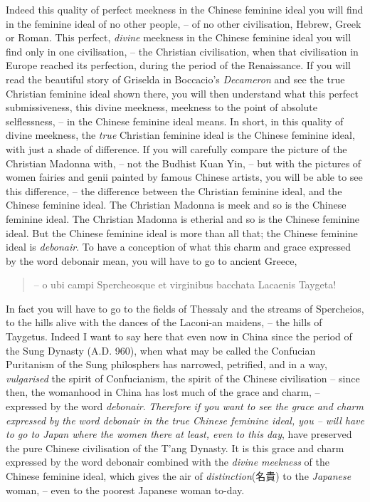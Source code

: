 Indeed this quality of perfect meekness in the Chinese feminine ideal you will find in the feminine ideal of no other people,
-- of no other civilisation, Hebrew, Greek or Roman.
This perfect, \emph{divine} meekness in the Chinese feminine ideal you will find only in one civilisation,
-- the Christian civilisation, when that civilisation in Europe reached its perfection, during the period of the Renaissance.
If you will read the beautiful story of Griselda in Boccacio's \emph{Decameron} and see the true Christian feminine ideal shown there,
you will then understand what this perfect submissiveness,
this divine meekness, meekness to the point of absolute selflessness,
-- in the Chinese feminine ideal means.
In short, in this quality of divine meekness, the \emph{true} Christian feminine ideal is the Chinese feminine ideal,
with just a shade of difference.
If you will carefully compare the picture of the Christian Madonna with,
-- not the Budhist Kuan Yin,
-- but with the pictures of women fairies and genii painted by famous Chinese artists, you will be able to see this difference,
-- the difference between the Christian feminine ideal, and the Chinese feminine ideal.
The Christian Madonna is meek and so is the Chinese feminine ideal.
The Christian Madonna is etherial and so is the Chinese feminine ideal.
But the Chinese feminine ideal is more than all that;
the Chinese feminine ideal is \emph{debonair}.
To have a conception of what this charm and grace expressed by the word debonair mean, you will have to go to ancient Greece,
\begin{quote}
-- o ubi campi Spercheosque et virginibus bacchata Lacaenis Taygeta!
\end{quote}

In fact you will have to go to the fields of Thessaly and the streams of Spercheios, to the hills alive with the dances of the Laconi-an maidens,
-- the hills of Taygetus.
Indeed I want to say here that even now in China since the period of the Sung Dynasty (A.D. 960),
when what may be called the Confucian Puritanism of the Sung philosphers has narrowed, petrified,
and in a way, \emph{vulgarised} the spirit of Confucianism, the spirit of the Chinese civilisation
-- since then, the womanhood in China has lost much of the grace and charm,
-- expressed by the word \emph{debonair}.
\emph{Therefore if you want to see the grace and charm expressed by the word debonair in the true Chinese feminine ideal, you
-- will have to go to Japan where the women there at least, even to this day},
have preserved the pure Chinese civilisation of the T'ang Dynasty.
It is this grace and charm expressed by the word debonair combined with the \emph{divine meekness} of the Chinese feminine ideal,
which gives the air of \emph{distinction}(名貴) to the \emph{Japanese} woman,  --  even to the poorest Japanese woman to-day.

